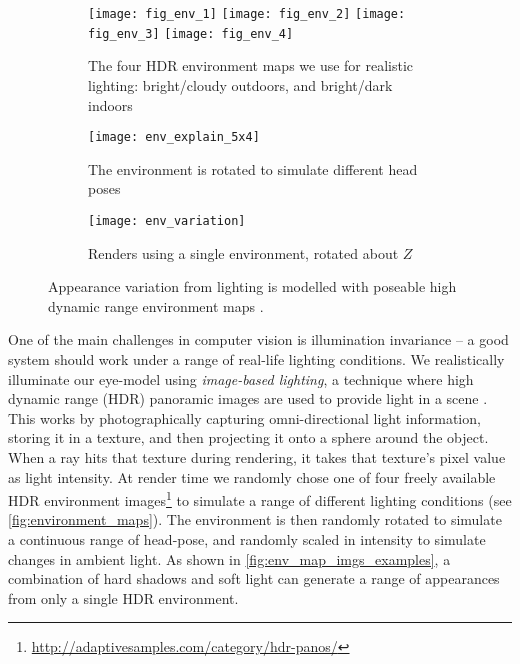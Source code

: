 \begin{figure}
    \begin{subfigure}[t]{\columnwidth}
        \texttt{[image: fig\_env\_1]} \hfill
    	\texttt{[image: fig\_env\_2]} \hfill
        \texttt{[image: fig\_env\_3]} \hfill
    	\texttt{[image: fig\_env\_4]}
	    \caption{The four HDR environment maps we use for realistic lighting: bright/cloudy outdoors, and bright/dark indoors}
    \end{subfigure}
    \par \medskip
    \begin{subfigure}[t]{0.48\columnwidth}
        \texttt{[image: env\_explain\_5x4]}
    	\caption{The environment is rotated to simulate different head poses}
    \end{subfigure}%
    \hfill
    \begin{subfigure}[t]{0.48\columnwidth}
        \texttt{[image: env\_variation]}
        \caption{Renders using a single environment, rotated about $Z$}
        \label{fig:env_map_imgs_examples}
    \end{subfigure}
    \caption{Appearance variation from lighting is modelled with poseable high dynamic range environment maps \cite{debevec2002image}.}
    \label{fig:environment_maps}
\end{figure}

One of the main challenges in computer vision is illumination invariance -- a good system should work under a range of real-life lighting conditions.
We realistically illuminate our eye-model using \emph{image-based lighting}, a technique where high dynamic range (HDR) panoramic images are used to provide light in a scene \cite{debevec2002image}.
This works by photographically capturing omni-directional light information, storing it in a texture, and then projecting it onto a sphere around the object.
When a ray hits that texture during rendering, it takes that texture's pixel value as light intensity.
At render time we randomly chose one of four freely available HDR environment images\footnote{\url{http://adaptivesamples.com/category/hdr-panos/}} to simulate a range of different lighting conditions (see \autoref{fig:environment_maps}).
The environment is then randomly rotated to simulate a continuous range of head-pose, and randomly scaled in intensity to simulate changes in ambient light.
As shown in \autoref{fig:env_map_imgs_examples}, a combination of hard shadows and soft light can generate a range of appearances from only a single HDR environment.


